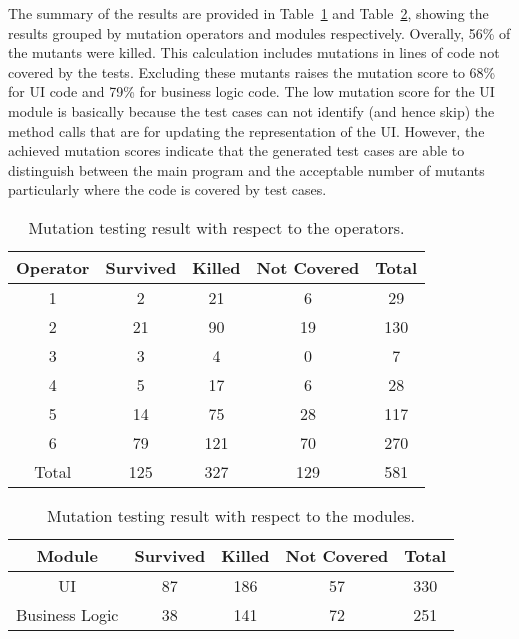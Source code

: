 The summary of the results are provided in Table~\ref{tbl:case-study-mutation-operators} and Table~\ref{tbl:case-study-mutation-modules}, showing the results grouped by mutation operators and modules respectively. Overally, 56\% of the mutants were killed. This calculation includes mutations in lines of code not covered by the tests. Excluding these mutants raises the mutation score to 68\% for UI code and 79\% for business logic code. The low mutation score for the UI module is basically because the test cases can not identify (and hence skip) the method calls that are for updating the representation of the UI. 
However, the achieved mutation scores indicate that the generated test cases are able to distinguish between the main program and the acceptable number of mutants particularly where the code is covered by test cases.

\begin{table}[!t]
\caption{Mutation testing result with respect to the operators.}
\label{tbl:case-study-mutation-operators}
\centering
\begin{tabular}{|c|c|c|c|c|}
\hline
Operator & Survived & Killed & Not Covered & Total \\ \hline
1 & 2 & 21 & 6 & 29 \\ \hline
2 & 21 & 90 & 19 & 130  \\ \hline
3 & 3 & 4 & 0 & 7 \\ \hline
4 & 5 & 17 & 6 & 28 \\ \hline
5 & 14 & 75 & 28 & 117 \\ \hline
6 & 79 & 121 & 70 & 270 \\ \hline\hline
Total & 125 & 327 & 129 & 581 \\
\hline
\end{tabular}
\end{table}

\begin{table}[!t]
\caption{Mutation testing result with respect to the modules.}
\label{tbl:case-study-mutation-modules}
\centering
\begin{tabular}{|c|c|c|c|c|}
\hline
Module & Survived & Killed & Not Covered & Total \\ \hline
UI & 87 & 186 & 57 & 330 \\ \hline
Business Logic & 38 & 141 & 72 & 251 \\
\hline
\end{tabular}
\end{table}

